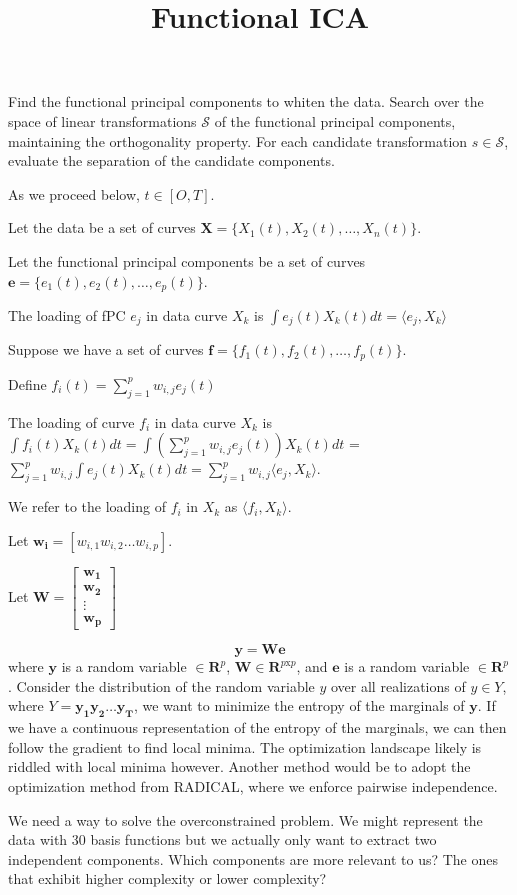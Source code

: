 \documentclass{article}
\title{Functional ICA}
\begin{document}
  
  \maketitle
  
  Find the functional principal components to whiten the data.
  Search over the space of linear transformations $\mathcal{S}$ of the functional principal components, maintaining the orthogonality property.
  For each candidate transformation $s \in \mathcal{S}$, evaluate the separation of the candidate components.

As we proceed below, $t \in [O, T]$.

Let the data be a set of curves $\mathbf{X} = \{X_1(t), X_2(t), \ldots, X_n(t)\}$.

Let the functional principal components be a set of curves $\mathbf{e} = \{e_1(t), e_2(t), \ldots, e_p(t)\}$.

The loading of fPC $e_j$ in data curve $X_k$ is $\int e_j(t) X_k(t) dt = \langle e_j, X_k \rangle$

Suppose we have a set of curves $\mathbf{f} = \{f_1(t), f_2(t), \ldots, f_p(t)\}$.

Define $f_i(t) = \sum_{j=1}^p w_{i,j} e_j(t)$

The loading of curve $f_i$ in data curve $X_k$ is $\int f_i(t) X_k(t) dt = \int (\sum_{j=1}^p w_{i,j} e_j(t)) X_k(t) dt$ = $\sum_{j=1}^p w_{i,j} \int e_j(t) X_k(t) dt = \sum_{j=1}^p w_{i,j} \langle e_j, X_k \rangle$.


We refer to the loading of $f_i$ in $X_k$ as $\langle f_i, X_k \rangle$.



Let $\mathbf{w_i} = [w_{i,1} w_{i,2} \ldots w_{i,p}]$.

Let
$
\mathbf{W} = \left[\begin{array}{c}
    \mathbf{w_1} \\
    \mathbf{w_2} \\
    \vdots \\
    \mathbf{w_p}
    \end{array}\right]
$


\begin{equation}
\mathbf{y} = \mathbf{W} \mathbf{e}
\end{equation}
where $\mathbf{y}$ is a random variable $\in \mathbf{R}^p$, $\mathbf{W} \in \mathbf{R}^{p \mathrm{x} p}$, and $\mathbf{e}$ is a random variable $\in \mathbf{R}^p$.
Consider the distribution of the random variable $y$ over all realizations of $y \in Y$, where $Y = {\mathbf{y_1} \mathbf{y_2} \ldots \mathbf{y_T}}$, we want to minimize the entropy of the marginals of $\mathbf{y}$. If we have a continuous representation of the entropy of the marginals, we can then follow the gradient to find local minima. The optimization landscape likely is riddled with local minima however. Another method would be to adopt the optimization method from RADICAL, where we enforce pairwise independence.

We need a way to solve the overconstrained problem. We might represent the data with 30 basis functions but we actually only want to extract two independent components. Which components are more relevant to us? The ones that exhibit higher complexity or lower complexity?  
  
\end{document}
